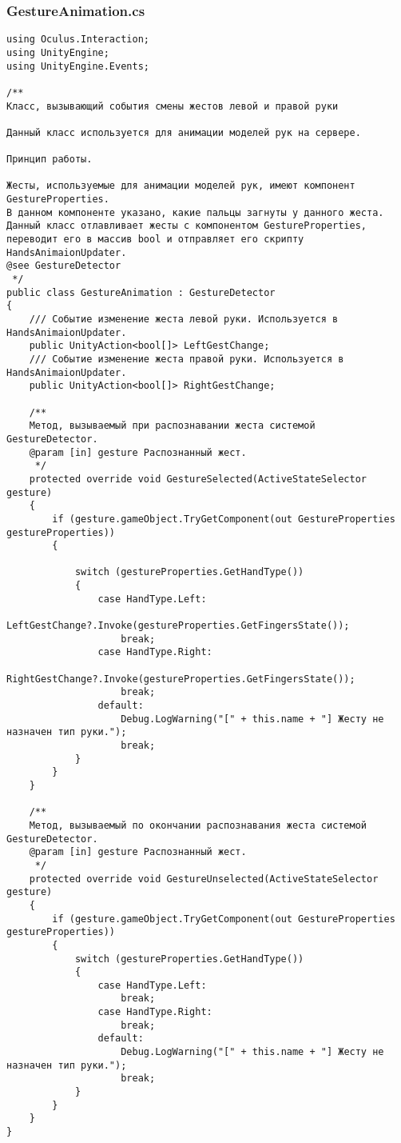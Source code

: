 \subsubsection*{GestureAnimation.cs}
\begin{verbatim}
﻿using Oculus.Interaction;
using UnityEngine;
using UnityEngine.Events;

/**
Класс, вызывающий события смены жестов левой и правой руки

Данный класс используется для анимации моделей рук на сервере. 

Принцип работы.

Жесты, используемые для анимации моделей рук, имеют компонент GestureProperties. 
В данном компоненте указано, какие пальцы загнуты у данного жеста. 
Данный класс отлавливает жесты с компонентом GestureProperties, переводит его в массив bool и отправляет его скрипту HandsAnimaionUpdater.
@see GestureDetector
 */
public class GestureAnimation : GestureDetector
{
    /// Событие изменение жеста левой руки. Используется в HandsAnimaionUpdater.
    public UnityAction<bool[]> LeftGestChange;
    /// Событие изменение жеста правой руки. Используется в HandsAnimaionUpdater.
    public UnityAction<bool[]> RightGestChange;

    /**
    Метод, вызываемый при распознавании жеста системой GestureDetector.
    @param [in] gesture Распознанный жест.
     */
    protected override void GestureSelected(ActiveStateSelector gesture)
    {
        if (gesture.gameObject.TryGetComponent(out GestureProperties gestureProperties))
        {

            switch (gestureProperties.GetHandType())
            {
                case HandType.Left:
                    LeftGestChange?.Invoke(gestureProperties.GetFingersState());
                    break;
                case HandType.Right:
                    RightGestChange?.Invoke(gestureProperties.GetFingersState());
                    break;
                default:
                    Debug.LogWarning("[" + this.name + "] Жесту не назначен тип руки.");
                    break;
            }
        }
    }

    /**
    Метод, вызываемый по окончании распознавания жеста системой GestureDetector.
    @param [in] gesture Распознанный жест.
     */
    protected override void GestureUnselected(ActiveStateSelector gesture)
    {
        if (gesture.gameObject.TryGetComponent(out GestureProperties gestureProperties))
        {
            switch (gestureProperties.GetHandType())
            {
                case HandType.Left:
                    break;
                case HandType.Right:
                    break;
                default:
                    Debug.LogWarning("[" + this.name + "] Жесту не назначен тип руки.");
                    break;
            }
        }
    }
}

\end{verbatim}

